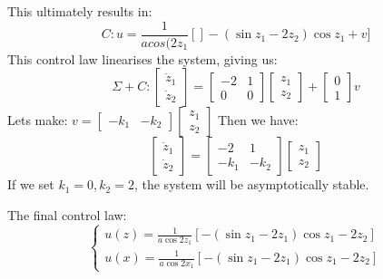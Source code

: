 {    This ultimately results in:
    \begin{equation}
        C : u = \frac{1}{acos(2z_1}[]-(\sin{z_1}-2z_2)\cos{z_1}+v]
    \end{equation}
   This control law linearises the system, giving us:
   \begin{equation}
       \Sigma +C : \begin{bmatrix}
           \dot{z}_1 \\\dot{z}_2
       \end{bmatrix}
       = \begin{bmatrix}
           -2 & 1 \\
           0 & 0
       \end{bmatrix}
       \begin{bmatrix}
           z_1 \\ z_2
       \end{bmatrix}
       + \begin{bmatrix}
           0 \\ 1
       \end{bmatrix}v
   \end{equation}
   Lets make: $v = \begin{bmatrix}
       -k_1 & -k_2 
   \end{bmatrix}
   \begin{bmatrix}
       z_1 \\ z_2
   \end{bmatrix}
   $
   Then we have:
   \begin{equation}
       \begin{bmatrix}
           \dot{z}_1 \\\dot{z}_2
       \end{bmatrix}
       = \begin{bmatrix}
           -2 & 1 \\
           -k_1& -k_2
       \end{bmatrix}
       \begin{bmatrix}
           z_1 \\ z_2
       \end{bmatrix}
   \end{equation}
    If we set $k_1=0, k_2=2$, the system will be asymptotically stable.

    The final control law:
    \begin{equation}
        \begin{cases}
            u(z) = \frac{1}{a\cos{2z_1}}[-(\sin{z_1}-2z_1)\cos{z_1}-2z_2]\\
            u(x) = \frac{1}{a\cos{2x_1}}[-(\sin{z_1}-2z_1)\cos{z_1}-2z_2]


        \end{cases}
        
    \end{equation}

}


